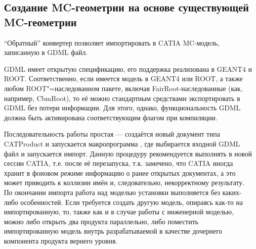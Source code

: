 %                                                    

\subsection[Создание MC-геометрии на основе существующей MC-геометрии]{Создание MC-геометрии на основе существующей\\ MC-геометрии}\label{sec:secMCtoCAD}

``Обратный'' конвертер  позволяет импортировать в CATIA MC-модель, записанную в GDML файл.

GDML имеет открытую спецификацию, его поддержка реализована в GEANT4 и ROOT. Соответственно, если имеется модель в GEANT4 или ROOT, а также любом ROOT"=наследованном пакете, включая FairRoot-наследованные (как, например, CbmRoot), то её можно стандартным средствами экспортировать в GDML без потери информации. Для этого, однако, функциональность GDML должна быть активирована соответствующим флагом при компиляции.

Последовательность работы простая --- создаётся новый документ типа CATProduct и запускается макропрограмма , где выбирается входной GDML файл и запускается импорт. Данную процедуру рекомендуется выполнять в новой сессии CATIA, т.е. после её перезапуска, т.к. замечено, что CATIA иногда хранит в фоновом режиме информацию о ранее открытых документах, а это может приводить к коллизии имён и, следовательно, некорректному результату. По окончании импорта работа над моделью установки выполняется без каких-либо особенностей. Если требуется создать другую модель, опираясь как-то на импортированную, то, также как и в случае работы с инженерной моделью, можно либо открыть два продукта параллельно, либо поместить импортированную модель внутрь разрабатываемой в качестве дочернего компонента продукта вернего уровня.
